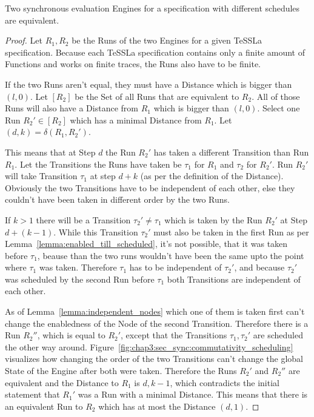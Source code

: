 \begin{theorem}[name = Equivalence of different synchronous evaluation Engines]\label{theorem:equivalence_sync_eval_engines}
  Two synchronous evaluation Engines for a specification with different schedules are equivalent.
\end{theorem}
\begin{proof}

Let \(R_1, R_2\) be the Runs of the two Engines for a given TeSSLa specification.
Because each TeSSLa specification contains only a finite amount of Functions and works on finite traces, the Runs also have to be finite.

If the two Runs aren't equal, they must have a Distance which is bigger than \((l, 0)\).
Let \([R_2]\) be the Set of all Runs that are equivalent to \(R_2\).
All of those Runs will also have a Distance from \(R_1\) which is bigger than \((l, 0)\).
Select one Run \(R_2' \in [R_2]\) which has a minimal Distance from \(R_1\).
Let \((d,k) = \delta(R_1, R_2')\).

This means that at Step \(d\) the Run \(R_2'\) has taken a different Transition than Run \(R_1\).
Let the Transitions the Runs have taken be \(\tau_1\) for \(R_1\) and \(\tau_2\) for \(R_2'\).
Run \(R_2'\) will take Transition \(\tau_1\) at step \(d+k\) (as per the definition of the Distance).
Obviously the two Transitions have to be independent of each other, else they couldn't have been taken in different order by the two Runs.

If \(k > 1\) there will be a Transition \(\tau_2' \neq \tau_1\) which is taken by the Run \(R_2'\) at Step \(d+(k-1)\).
While this Transition \(\tau_2'\) must also be taken in the first Run as per Lemma~\ref{lemma:enabled_till_scheduled}, it's not possible, that it was taken before \(\tau_1\), beause than the two runs wouldn't have been the same upto the point where \(\tau_1\) was taken.
Therefore \(\tau_1\) has to be independent of \(\tau_2'\), and because \(\tau_2'\) was scheduled by the second Run before \(\tau_1\) both Transitions are independent of each other.

As of Lemma~\ref{lemma:independent_nodes} which one of them is taken first can't change the enabledness of the Node of the second Transition.
Therefore there is a Run \(R_2''\), which is equal to \(R_2'\), except that the Transitions \(\tau_1, \tau_2'\) are scheduled the other way around.
Figure~\ref{fig:chap3:sec_sync:commutativity_scheduling} visualizes how changing the order of the two Transitions can't change the global State of the Engine after both were taken.
Therefore the Runs \(R_2'\) and \(R_2''\) are equivalent and the Distance to \(R_1\) is \(d, k-1\), which contradicts the initial statement that \(R_1'\) was a Run with a minimal Distance.
This means that there is an equivalent Run to \(R_2\) which has at most the Distance \((d, 1)\).


\end{proof}
